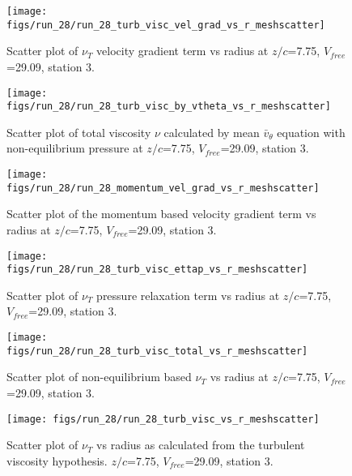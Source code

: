 \begin{figure}[H]
\centering
\texttt{[image: figs/run\_28/run\_28\_turb\_visc\_vel\_grad\_vs\_r\_meshscatter]}
\caption{Scatter plot of $\nu_T$ velocity gradient term vs radius at $z/c$=7.75, $V_{free}$=29.09, station 3.}
\end{figure}


\begin{figure}[H]
\centering
\texttt{[image: figs/run\_28/run\_28\_turb\_visc\_by\_vtheta\_vs\_r\_meshscatter]}
\caption{Scatter plot of total viscosity $\nu$ calculated by mean $\bar{v}_{\theta}$ equation with non-equilibrium pressure at $z/c$=7.75, $V_{free}$=29.09, station 3.}
\end{figure}


\begin{figure}[H]
\centering
\texttt{[image: figs/run\_28/run\_28\_momentum\_vel\_grad\_vs\_r\_meshscatter]}
\caption{Scatter plot of the momentum based velocity gradient term vs radius at $z/c$=7.75, $V_{free}$=29.09, station 3.}
\end{figure}


\begin{figure}[H]
\centering
\texttt{[image: figs/run\_28/run\_28\_turb\_visc\_ettap\_vs\_r\_meshscatter]}
\caption{Scatter plot of $\nu_T$ pressure relaxation term vs radius at $z/c$=7.75, $V_{free}$=29.09, station 3.}
\end{figure}


\begin{figure}[H]
\centering
\texttt{[image: figs/run\_28/run\_28\_turb\_visc\_total\_vs\_r\_meshscatter]}
\caption{Scatter plot of non-equilibrium based $\nu_T$ vs radius at $z/c$=7.75, $V_{free}$=29.09, station 3.}
\end{figure}


\begin{figure}[H]
\centering
\texttt{[image: figs/run\_28/run\_28\_turb\_visc\_vs\_r\_meshscatter]}
\caption{Scatter plot of $\nu_T$ vs radius as calculated from the turbulent viscosity hypothesis. $z/c$=7.75, $V_{free}$=29.09, station 3.}
\end{figure}



